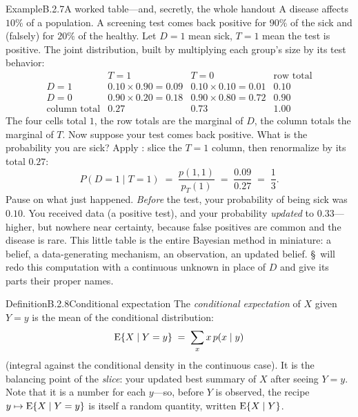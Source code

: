 \documentclass[main.tex]{subfiles}
\begin{document}
\begin{ObjL}{Example}{B.2.7}{A worked table---and, secretly, the whole handout}
A disease affects $10\%$ of a population. A screening test comes back positive for $90\%$ of
the sick and (falsely) for $20\%$ of the healthy. Let $D=1$ mean sick, $T=1$ mean the test is
positive. The joint distribution, built by multiplying each group's size by its test
behavior:
\[ \begin{array}{c|cc|c}
     & T=1 & T=0 & \text{row total}\\ \hline
   D=1 & 0.10\times0.90 = 0.09 & 0.10\times0.10 = 0.01 & 0.10\\
   D=0 & 0.90\times0.20 = 0.18 & 0.90\times0.80 = 0.72 & 0.90\\ \hline
   \text{column total} & 0.27 & 0.73 & 1.00
   \end{array} \]
The four cells total $1$, the row totals are the marginal of $D$, the column totals the
marginal of $T$. Now suppose your test comes back positive. What is the probability you are
sick? Apply : slice the $T=1$ column, then renormalize by its total $0.27$:
\[ P(D=1 \mid T=1) \;=\; \frac{p(1,1)}{p_T(1)} \;=\; \frac{0.09}{0.27} \;=\; \frac13 . \]
Pause on what just happened. \emph{Before} the test, your probability of being sick was
$0.10$. You received data (a positive test), and your probability \emph{updated} to
$0.33$---higher, but nowhere near certainty, because false positives are common and the
disease is rare. This little table is the entire Bayesian method in miniature: a belief, a
data-generating mechanism, an observation, an updated belief. \S\, will redo this
computation with a continuous unknown in place of $D$ and give its parts their proper names.
\end{ObjL}

\begin{Obj}{Definition}{B.2.8}{Conditional expectation}
The \emph{conditional expectation} of $X$ given $Y=y$ is the mean of the conditional
distribution:
\[ \mathrm{E}\{X \mid Y=y\} \;=\; \sum_x x\, p(x\mid y) \]
(integral against the conditional density in the continuous case). It is the balancing point
of the \emph{slice}: your updated best summary of $X$ after seeing $Y=y$. Note that it is a
number for each $y$---so, before $Y$ is observed, the recipe $y\mapsto\mathrm{E}\{X\mid Y=y\}$ is
itself a random quantity, written $\mathrm{E}\{X\mid Y\}$.
\end{Obj}
\end{document}
